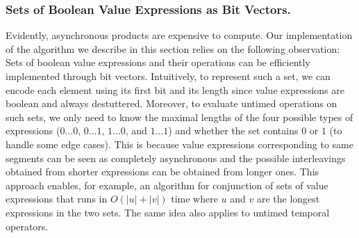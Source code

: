 






\subsubsection{Sets of Boolean Value Expressions as Bit Vectors.}
Evidently, asynchronous products are expensive to compute.
Our implementation of the algorithm we describe in this section relies on the following observation:
Sets of boolean value expressions and their operations can be efficiently implemented through bit vectors.
Intuitively, to represent such a set, we can encode each element using its first bit and its length since value expressions are boolean and always destuttered.
Moreover, to evaluate untimed operations on such sets, we only need to know the maximal lengths of the four possible types of expressions ($0 \ldots 0$, $0 \ldots 1$, $1 \ldots 0$, and $1 \ldots 1$) and whether the set contains $0$ or $1$ (to handle some edge cases).
This is because value expressions corresponding to same segments can be seen as completely asynchronous and the possible interleavings obtained from shorter expressions can be obtained from longer ones.
This approach enables, for example, an algorithm for conjunction of sets of value expressions that runs in $O(|u| + |v|)$ time where $u$ and $v$ are the longest expressions in the two sets.
The same idea also applies to untimed temporal operators.


